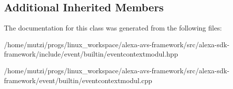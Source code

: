 \subsection*{Additional Inherited Members}


The documentation for this class was generated from the following files\+:\begin{DoxyCompactItemize}
\item 
/home/mutzi/progs/linux\+\_\+workspace/alexa-\/avs-\/framework/src/alexa-\/sdk-\/framework/include/event/builtin/eventcontextmodul.\+hpp\item 
/home/mutzi/progs/linux\+\_\+workspace/alexa-\/avs-\/framework/src/alexa-\/sdk-\/framework/event/builtin/eventcontextmodul.\+cpp\end{DoxyCompactItemize}
